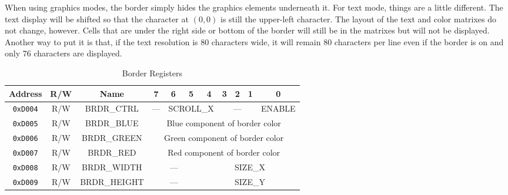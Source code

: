 When using graphics modes, the border simply hides the graphics elements underneath it. For text mode, things are a little different. The text display will be shifted so that the character at $(0, 0)$ is still the upper-left character. The layout of the text and color matrixes do not change, however. Cells that are under the right side or bottom of the border will still be in the matrixes but will not be displayed. Another way to put it is that, if the text resolution is 80 characters wide, it will remain 80 characters per line even if the border is on and only 76 characters are displayed.

\begin{table}[ht]
    \begin{center}
        \begin{tabular}{|c|c|c|c|c|c|c|c|c|c|c|} \hline
            Address & R/W & Name & 7 & 6 & 5 & 4 & 3 & 2 & 1 & 0 \\\hline\hline
            \verb+0xD004+ & R/W & BRDR\_CTRL & --- & \multicolumn{3}{|c|}{SCROLL\_X} & \multicolumn{3}{|c|}{---} & ENABLE \\ \hline
            \verb+0xD005+ & R/W & BRDR\_BLUE & \multicolumn{8}{|c|}{Blue component of border color} \\ \hline
            \verb+0xD006+ & R/W & BRDR\_GREEN & \multicolumn{8}{|c|}{Green component of border color} \\ \hline
            \verb+0xD007+ & R/W & BRDR\_RED & \multicolumn{8}{|c|}{Red component of border color} \\ \hline
            \verb+0xD008+ & R/W & BRDR\_WIDTH & \multicolumn{3}{|c|}{---} & \multicolumn{5}{|c|}{SIZE\_X} \\ \hline
            \verb+0xD009+ & R/W & BRDR\_HEIGHT & \multicolumn{3}{|c|}{---} & \multicolumn{5}{|c|}{SIZE\_Y} \\ \hline
        \end{tabular}
    \end{center}
    \caption{Border Registers}
    \label{tab:brdr_reg}
\end{table}

